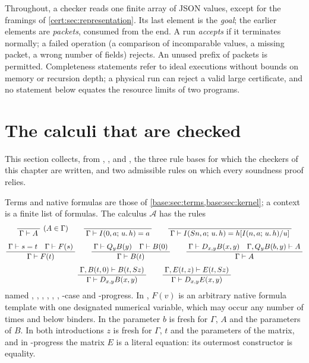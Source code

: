 Throughout, a checker reads one finite array of JSON values, except for the
framings of \cref{cert:sec:representation}. Its last element
is the \emph{goal}; the earlier elements are \emph{packets}, consumed from the
end. A run \emph{accepts} if it terminates normally; a failed operation (a
comparison of incomparable values, a missing packet, a wrong number of
fields) rejects. An unused prefix of packets is permitted. Completeness
statements refer to ideal executions without bounds on memory or recursion
depth; a physical run can reject a valid large certificate, and no statement
below equates the resource limits of two programs.

\section{The calculi that are checked}\label{cert:sec:calculi}

This section collects, from , ,
 and , the three rule bases
for which the checkers of this chapter are written, and two admissible rules
on which every soundness proof relies.

\begin{definition}\label{cert:def:A}
Terms and native formulas are those of \cref{base:sec:terms,base:sec:kernel};
a context is a finite list of formulas. The calculus $\mathcal A$ has the
rules
\begin{gather*}
\dfrac{\;\;}{\;\Gamma\vdash A\;}\ (A\in\Gamma)
\qquad
\dfrac{\;\;}{\;\Gamma\vdash I(0,a;\,u.\,h)=a\;}
\qquad
\dfrac{\;\;}{\;\Gamma\vdash I(S n,a;\,u.\,h)=h[I(n,a;\,u.\,h)/u]\;}
\\[4pt]
\dfrac{\;\Gamma\vdash s=t\quad \Gamma\vdash F(s)\;}{\;\Gamma\vdash F(t)\;}
\qquad
\dfrac{\;\Gamma\vdash Q_{y}B(y)\quad \Gamma\vdash B(0)\;}{\;\Gamma\vdash B(t)\;}
\qquad
\dfrac{\;\Gamma\vdash D_{x,y}B(x,y)\quad \Gamma,Q_{y}B(b,y)\vdash A\;}{\;\Gamma\vdash A\;}
\\[4pt]
\dfrac{\;\Gamma,B(t,0)\vdash B(t,S z)\;}{\;\Gamma\vdash D_{x,y}B(x,y)\;}
\qquad
\dfrac{\;\Gamma,E(t,z)\vdash E(t,S z)\;}{\;\Gamma\vdash D_{x,y}E(x,y)\;}
\end{gather*}
named , , , ,
, , -case and -progress.
In , $F(v)$ is an arbitrary native formula template with one
designated numerical variable, which may occur any number of times and below
binders. In  the parameter $b$ is fresh for $\Gamma$, $A$ and the
parameters of $B$. In both introductions $z$ is fresh for $\Gamma$, $t$ and
the parameters of the matrix, and in -progress the matrix $E$ is a
literal equation: its outermost constructor is equality.
\end{definition}

